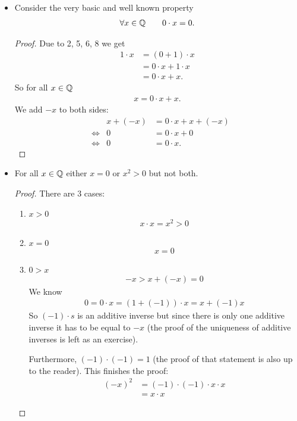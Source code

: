 \begin{ex}
	\begin{itemize}
		\item 
		Consider the very basic and well known property
	\begin{align*}
	\forall x \in \mathbb Q \qquad 0 \cdot x = 0 .
	\end{align*}
	\begin{proof}
		Due to 2, 5, 6, 8 we get
		\begin{align*}
		1 \cdot x & = (0+1) \cdot x \\
		& = 0 \cdot x + 1 \cdot x \\
		& = 0 \cdot x +  x . 
		\end{align*}
		So for all $x \in \mathbb Q$
		\begin{align*}
		x = 0 \cdot x + x.
		\end{align*}
		We add $-x$ to both sides:
		\begin{align*}
		& & x + (-x) & = 0 \cdot x + x + (-x) \\
		& \Leftrightarrow &  0 & = 0 \cdot x + 0 \\
		& \Leftrightarrow &  0 & = 0 \cdot x.
		\end{align*}
	\end{proof}
	\item
	For all $x \in \mathbb Q$ either $x = 0$ or $x^2 > 0$ but not both.
	\begin{proof}
		There are 3 cases:
		\begin{enumerate}
			\item $x > 0$
			\begin{align*}
			x \cdot x = x^2  > 0
			\end{align*}
			\item $x = 0$
			\begin{align*}
			x = 0
			\end{align*}
			\item $0 > x$
			\begin{align*}
			-x > x + (-x) = 0
			\end{align*}
			We know
			\begin{align*}
			0 = 0 \cdot x = (1+ (-1)) \cdot x = x + (-1)x
			\end{align*}
			So $(-1) \cdot s$ is an additive inverse but since there is only one additive inverse it has to be equal to $-x$ (the proof of the uniqueness of additive inverses is left as an exercise).
			
			Furthermore, $(-1) \cdot (-1) = 1$ (the proof of that statement is also up to the reader). 
			This finishes the proof:
			\begin{align*}
			(-x)^2 & = (-1) \cdot (-1) \cdot x \cdot x \\
			& = x \cdot x
			\end{align*}
		\end{enumerate}
	\end{proof}
\end{itemize}
\end{ex}

